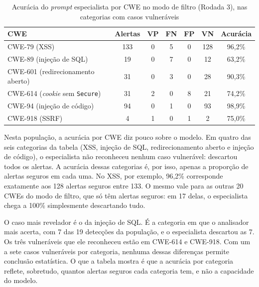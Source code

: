 \begin{table}[htpb]
    \centering
    \caption[Acurácia do especialista por CWE]{Acurácia do \textit{prompt} especialista por CWE no modo de filtro (Rodada 3), nas categorias com casos vulneráveis}
    \label{tab:acuraciacwe}
    \renewcommand{\arraystretch}{1.4}
    \begin{tabular}{|l|c|c|c|c|c|c|}
        \hline
        \textbf{CWE} & \textbf{Alertas} & \textbf{VP} & \textbf{FN} & \textbf{FP} & \textbf{VN} & \textbf{Acurácia} \\
        \hline
        CWE-79 (XSS) & 133 & 0 & 5 & 0 & 128 & 96,2\% \\
        \hline
        CWE-89 (injeção de SQL) & 19 & 0 & 7 & 0 & 12 & 63,2\% \\
        \hline
        CWE-601 (redirecionamento aberto) & 31 & 0 & 3 & 0 & 28 & 90,3\% \\
        \hline
        CWE-614 (\textit{cookie} sem \texttt{Secure}) & 31 & 2 & 0 & 8 & 21 & 74,2\% \\
        \hline
        CWE-94 (injeção de código) & 94 & 0 & 1 & 0 & 93 & 98,9\% \\
        \hline
        CWE-918 (SSRF) & 4 & 1 & 0 & 1 & 2 & 75,0\% \\
        \hline
    \end{tabular}
    \fontepesquisa
\end{table}

Nesta população, a acurácia por CWE diz pouco sobre o modelo. Em quatro das seis categorias da tabela (XSS, injeção de SQL, redirecionamento aberto e injeção de código), o especialista não reconheceu nenhum caso vulnerável: descartou todos os alertas. A acurácia dessas categorias é, por isso, apenas a proporção de alertas seguros em cada uma. No XSS, por exemplo, 96,2\% corresponde exatamente aos 128 alertas seguros entre 133. O mesmo vale para as outras 20 CWEs do modo de filtro, que só têm alertas seguros: em 17 delas, o especialista chega a 100\% simplesmente descartando tudo.

O caso mais revelador é o da injeção de SQL. É a categoria em que o analisador mais acerta, com 7 das 19 detecções da população, e o especialista descartou as 7. Os três vulneráveis que ele reconheceu estão em CWE-614 e CWE-918. Com um a sete casos vulneráveis por categoria, nenhuma dessas diferenças permite conclusão estatística. O que a tabela mostra é que a acurácia por categoria reflete, sobretudo, quantos alertas seguros cada categoria tem, e não a capacidade do modelo.

